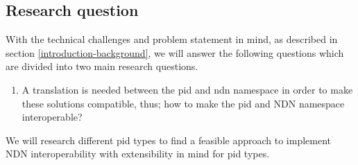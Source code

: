 


\subsection{Research question}
\label{introduction-research-question}
With the technical challenges and problem statement in mind, as described in section \ref{introduction-background}, we will answer the following questions which are divided into two main research questions.

\begin{enumerate}
	\item A translation is needed between the \gls{pid} and \gls{ndn} namespace in order to make these solutions compatible, thus; how to make the \gls{pid} and NDN namespace interoperable?
\end{enumerate}

We will research different \gls{pid} types to find a feasible approach to implement NDN interoperability with extensibility in mind for \gls{pid} types.

